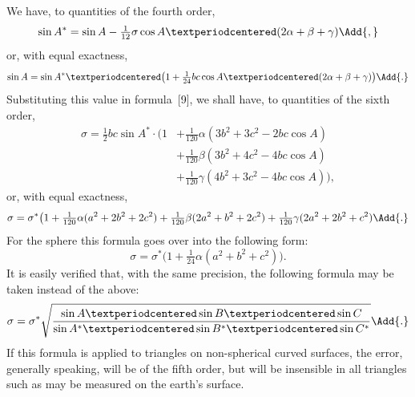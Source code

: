 We have, to quantities of the fourth order,
\[
\sin A^{*} = \sin A - \tfrac{1}{12}\sigma\cos A·(2\alpha + \beta + \gamma)\Add{,}
\]
or, with equal exactness,
\[
\sin A = \sin A^{*}·\bigl(1 + \tfrac{1}{24}bc\cos A·(2\alpha + \beta + \gamma)\bigr)\Add{.}
\]
Substituting this value in formula~[9], we shall have, to quantities of the sixth order,
\begin{align*}
\sigma = \tfrac{1}{2}bc\sin A^{*}·\bigl(1
  &+ \tfrac{1}{120}\alpha(3b^{2}+ 3c^{2} - 2bc\cos A) \\
  &+ \tfrac{1}{120}\beta (3b^{2}+ 4c^{2} - 4bc\cos A) \\
  &+ \tfrac{1}{120}\gamma(4b^{2}+ 3c^{2} - 4bc\cos A)\bigr),
\end{align*}
or, with equal exactness,
\[
\sigma = \sigma^{*}\bigl(1
  + \tfrac{1}{120}\alpha(a^{2} + 2b^{2} + 2c^{2})
  + \tfrac{1}{120}\beta (2a^{2} + b^{2} + 2c^{2})
  + \tfrac{1}{120}\gamma(2a^{2} + 2b^{2} + c^{2})\Add{.}
\]
For the sphere this formula goes over into the following form:
\[
\sigma = \sigma^{*}\bigl(1 + \tfrac{1}{24}\alpha(a^{2} + b^{2} + c^{2})\bigr).
\]
It is easily verified that, with the same precision, the following formula may be taken
instead of the above:
\[
\sigma
  = \sigma^{*}\sqrt{\frac{\sin A·\sin B·\sin C}
                         {\sin A^{*}·\sin B^{*}·\sin C^{*}}}\Add{.}
\]
If this formula is applied to triangles on non-spherical curved surfaces, the error, generally
speaking, will be of the fifth order, but will be insensible in all triangles such
as may be measured on the earth's surface.


